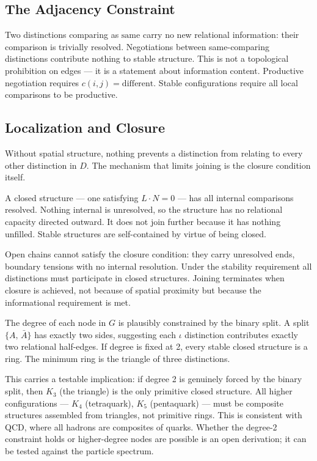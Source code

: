 \documentclass[11pt,letterpaper]{article}
\begin{document}
\subsection{The Adjacency Constraint}
\label{sec:org33ebfda}

Two distinctions comparing as \(\mathrm{same}\) carry no new relational information: their comparison is trivially resolved. Negotiations between same-comparing distinctions contribute nothing to stable structure. This is not a topological prohibition on edges --- it is a statement about information content. Productive negotiation requires \(c(i,j) = \mathrm{different}\). Stable configurations require all local comparisons to be productive.

\subsection{Localization and Closure}
\label{sec:orgafe0f1f}

Without spatial structure, nothing prevents a distinction from relating to every other distinction in \(D\). The mechanism that limits joining is the closure condition itself.

A closed structure --- one satisfying \(L \cdot N = 0\) --- has all internal comparisons resolved. Nothing internal is unresolved, so the structure has no relational capacity directed outward. It does not join further because it has nothing unfilled. Stable structures are self-contained by virtue of being closed.

Open chains cannot satisfy the closure condition: they carry unresolved ends, boundary tensions with no internal resolution. Under the stability requirement all distinctions must participate in closed structures. Joining terminates when closure is achieved, not because of spatial proximity but because the informational requirement is met.

The degree of each node in \(G\) is plausibly constrained by the binary split. A split \(\{A,\, \bar{A}\}\) has exactly two sides, suggesting each \(\iota\) distinction contributes exactly two relational half-edges. If degree is fixed at 2, every stable closed structure is a ring. The minimum ring is the triangle of three distinctions.

This carries a testable implication: if degree 2 is genuinely forced by the binary split, then \(K_3\) (the triangle) is the only primitive closed structure. All higher configurations --- \(K_4\) (tetraquark), \(K_5\) (pentaquark) --- must be composite structures assembled from triangles, not primitive rings. This is consistent with QCD, where all hadrons are composites of quarks. Whether the degree-2 constraint holds or higher-degree nodes are possible is an open derivation; it can be tested against the particle spectrum.
\end{document}
